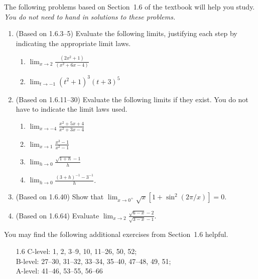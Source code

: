 \documentclass{article}
\title{\commonPSTitleZeroOneSix}
\author{\commonAuthor}
\date{\commonDateZeroOneSix}
\newcommand{\ds}{\displaystyle}
\begin{document}
\maketitle
\thispagestyle{empty}

\noindent
The following problems based on Section~1.6 of the textbook will help
you study.  \emph{You do not need to hand in solutions to these
  problems.}
\begin{enumerate}
\item (Based on 1.6.3--5) %
  Evaluate the following limits, justifying each step by indicating
  the appropriate limit laws.
  \begin{multicols}{2}
  \begin{enumerate}
  \item $\ds \lim_{x\to 2} \frac{(2x^2+1)}{(x^2+6x-4)}$
  \item $\ds \lim_{t\to -1} (t^2+1)^3(t+3)^5 $
  \end{enumerate}
  \end{multicols}
\item (Based on 1.6.11--30) %
  Evaluate the following limits if they exist.  You do not have to
  indicate the limit laws used.
  \begin{multicols}{4}
  \begin{enumerate}
  \item $\ds\lim_{x\to -4} \frac{x^2+5x+4}{x^2+3x-4}$
  \item $\ds\lim_{x\to 1}  \frac{x^3-1}{x^2-1}$
  \item $\ds\lim_{h\to 0}  \frac{\sqrt{1+h}-1}{h}$
  \item $\ds\lim_{h\to 0}  \frac{(3+h)^{-1}-3^{-1}}{h}$.
  \end{enumerate}
  \end{multicols}
\item (Based on 1.6.40) %
  Show that $\ds\lim_{x\to 0^+} \sqrt{x} [1+\sin^2(2\pi/x)] = 0$.
\item (Based on 1.6.64) %
  Evaluate $\ds \lim_{x\to 2} \frac{\sqrt{6-x}-2}{\sqrt{3-x}-1}$.
\end{enumerate}

\noindent
You may find the following additional exercises from Section~1.6 helpful.
\begin{itemize}
\item[1.6] C-level: 1, 2, 3--9, 10, 11--26, 50, 52; \\
  B-level: 27--30, 31--32, 33--34, 35--40, 47--48, 49, 51; \\
  A-level: 41--46, 53--55, 56--66
\end{itemize}
\end{document}
